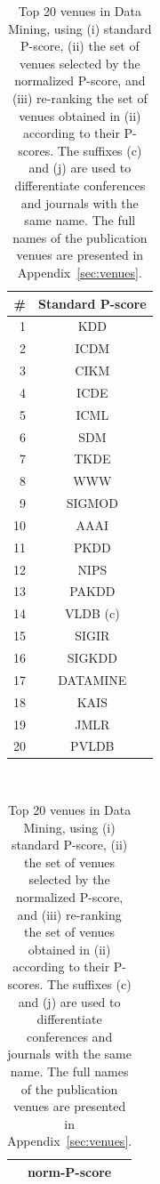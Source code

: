 \documentclass[msc]{ppgccufmg}
\begin{document}
\begin{table}[htbp]
\centering
\caption{Top 20 venues in Data Mining, using (i) standard P-score, (ii) the set of venues selected by the normalized P-score, and (iii) re-ranking the set of venues obtained in (ii) according to their P-scores. The suffixes (c) and (j) are used to differentiate conferences and journals with the same name. The full names of the publication venues are presented in Appendix~\ref{sec:venues}.}
\label{tab:dm-venues}
\begin{tabular}{rc}
\toprule
\#		&	Standard P-score \\ 
\midrule
1		&		KDD			\\
2		&		ICDM		\\
3		&		CIKM		\\
4		&		ICDE		\\
5		&		ICML		\\
6		&		SDM			\\
7		&		TKDE		\\
8		&		WWW			\\
9		&		SIGMOD		\\
10		&		AAAI		\\
11		&		PKDD		\\
12		&		NIPS		\\
13		&		PAKDD		\\
14		&		VLDB (c)	\\
15		&		SIGIR		\\
16		&		SIGKDD		\\
17		&		DATAMINE	\\
18		&		KAIS		\\
19		&		JMLR		\\
20		&		PVLDB		\\
\bottomrule
\end{tabular} \ \ 
\begin{tabular}{c}
\toprule
norm-P-score \\ 
\midrule

\end{tabular}
\end{table}
\end{document}
